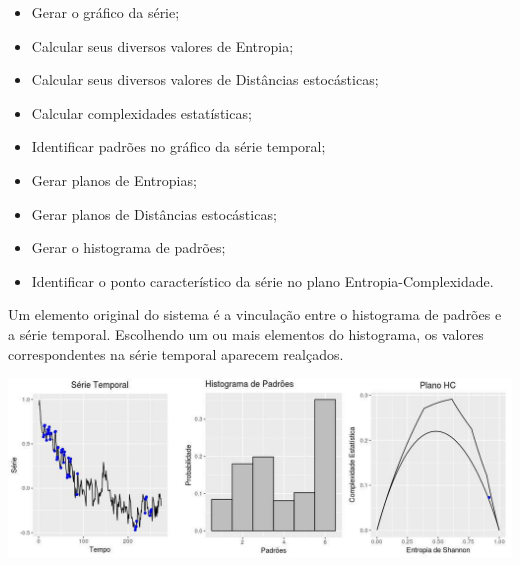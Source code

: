\documentclass[a0,portrait]{sciposter}
\begin{document}
\begin{multicols}{2}
\begin{itemize}[leftmargin=1.0in]
	\item[\HandRight] Gerar o gráfico da série;
	\item[\HandRight] Calcular seus diversos valores de Entropia;
	\item[\HandRight] Calcular seus diversos valores de Distâncias estocásticas;
	\item[\HandRight] Calcular complexidades estatísticas;
    \item[\HandRight] Identificar padrões no gráfico da série temporal;
    \item[\HandRight] Gerar planos de Entropias;
    \item[\HandRight] Gerar planos de Distâncias estocásticas;
	\item[\HandRight] Gerar o histograma de padrões;
	\item[\HandRight] Identificar o ponto característico da série no plano Entropia-Complexidade.
\end{itemize}

Um elemento original do sistema é a vinculação entre o histograma de padrões e a série temporal. Escolhendo um ou mais elementos do histograma, os valores correspondentes na série temporal aparecem realçados.

\begin{center}\vspace{1cm}
\includegraphics[width=1\linewidth]{img1}
\end{center}\vspace{1cm}


\end{multicols}
\end{document}
